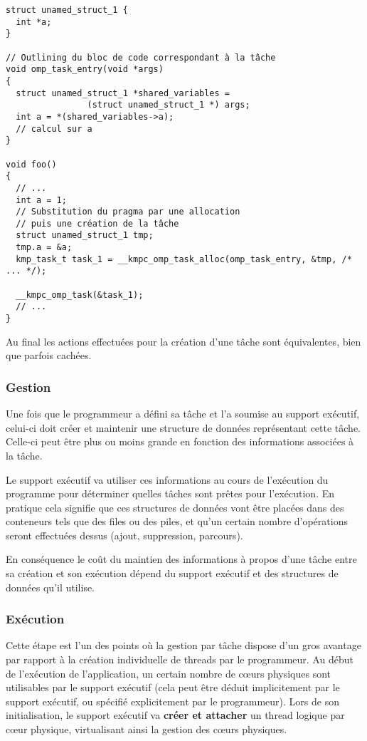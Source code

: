 \begin{lstlisting}
struct unamed_struct_1 {
  int *a;
}

// Outlining du bloc de code correspondant à la tâche
void omp_task_entry(void *args)
{
  struct unamed_struct_1 *shared_variables =
                (struct unamed_struct_1 *) args;
  int a = *(shared_variables->a);
  // calcul sur a
}

void foo()
{
  // ...
  int a = 1;
  // Substitution du pragma par une allocation
  // puis une création de la tâche
  struct unamed_struct_1 tmp;
  tmp.a = &a;
  kmp_task_t task_1 = __kmpc_omp_task_alloc(omp_task_entry, &tmp, /* ... */);

  __kmpc_omp_task(&task_1);
  // ...
}
\end{lstlisting}

Au final les actions effectuées pour la création d'une tâche sont équivalentes, bien que parfois cachées.


\subsubsection{Gestion}

Une fois que le programmeur a défini sa tâche et l'a soumise au support exécutif, celui-ci doit créer et maintenir une structure de données représentant cette tâche.
Celle-ci peut être plus ou moins grande en fonction des informations associées à la tâche.

Le support exécutif va utiliser ces informations au cours de l'exécution du programme pour déterminer quelles tâches sont prêtes pour l'exécution.
En pratique cela signifie que ces structures de données vont être placées dans des conteneurs tels que des files ou des piles, et qu'un certain nombre d'opérations seront effectuées dessus (ajout, suppression, parcours).

En conséquence le coût du maintien des informations à propos d'une tâche entre sa création et son exécution dépend du support exécutif et des structures de données qu'il utilise.


\subsubsection{Exécution}

Cette étape est l'un des points où la gestion par tâche dispose d'un gros avantage par rapport à la création individuelle de threads par le programmeur.
Au début de l'exécution de l'application, un certain nombre de cœurs physiques sont utilisables par le support exécutif (cela peut être déduit implicitement par le support exécutif, ou spécifié explicitement par le programmeur).
Lors de son initialisation, le support exécutif va \textbf{créer et attacher} un thread logique par cœur physique, virtualisant ainsi la gestion des cœurs physiques.

